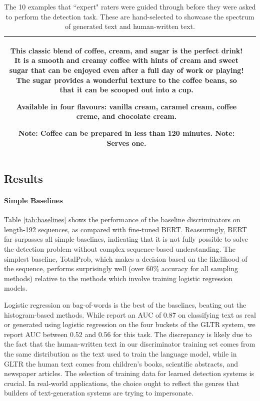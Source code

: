 \begin{table}[]
\begin{tabular}{c|p{5.5in}}
This classic blend of coffee, cream, and sugar is the perfect drink! It is a smooth and creamy coffee with hints of cream and sweet sugar that can be enjoyed even after a full day of work or playing! The sugar provides a wonderful texture to the coffee beans, so that it can be scooped out into a cup.

Available in four flavours: vanilla cream, caramel cream, coffee creme, and chocolate cream.

Note: Coffee can be prepared in less than 120 minutes.
Note: Serves one.
\\
\hline
    \end{tabular}
    \caption{The 10 examples that ``expert" raters were guided through before they were asked to perform the detection task. These are hand-selected to showcase the spectrum of generated text and human-written text.}
    \label{tab:expert_rater_training}
\end{table}


\subsection{Results}
\label{section:auto_detection}
\paragraph{Simple Baselines}
Table \ref{tab:baselines} shows the performance of the baseline discriminators on length-192 sequences, as compared with fine-tuned BERT.
Reassuringly, BERT far surpasses all simple baselines, indicating that it is not fully possible to solve the detection problem without complex sequence-based understanding.
The simplest baseline, TotalProb, which makes a decision based on the likelihood of the sequence, performs surprisingly well (over 60\% accuracy for all sampling methods) relative to the methods which involve training logistic regression models.

Logistic regression on bag-of-words is the best of the baselines, beating out the histogram-based methods.
While \citet{gehrmann2019gltr} report an AUC of 0.87 on classifying text as real or generated using logistic regression on the four buckets of the GLTR system, we report AUC between 0.52 and 0.56 for this task.
The discrepancy is likely due to the fact that the human-written text in our discriminator training set comes from the same distribution as the text used to train the language model, while in GLTR the human text comes from children's books, scientific abstracts, and newspaper articles. 
The selection of training data for learned detection systems is crucial. In real-world applications, the choice ought to reflect the genres that builders of text-generation systems are trying to impersonate. 

